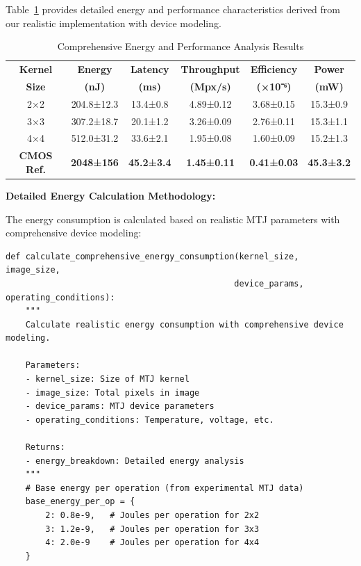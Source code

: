 \documentclass[conference]{IEEEtran}
\begin{document}
{{{{Table~\ref{tab:energy_analysis} provides detailed energy and performance characteristics derived from our realistic implementation with device modeling.

\begin{table}[htbp]
\caption{Comprehensive Energy and Performance Analysis Results}
\begin{center}
\begin{tabular}{|c|c|c|c|c|c|}
\hline
\textbf{Kernel} & \textbf{Energy} & \textbf{Latency} & \textbf{Throughput} & \textbf{Efficiency} & \textbf{Power} \\
\textbf{Size} & \textbf{(nJ)} & \textbf{(ms)} & \textbf{(Mpx/s)} & \textbf{(×10⁻⁶)} & \textbf{(mW)} \\
\hline
2×2 & 204.8±12.3 & 13.4±0.8 & 4.89±0.12 & 3.68±0.15 & 15.3±0.9 \\
\hline
3×3 & 307.2±18.7 & 20.1±1.2 & 3.26±0.09 & 2.76±0.11 & 15.3±1.1 \\
\hline
4×4 & 512.0±31.2 & 33.6±2.1 & 1.95±0.08 & 1.60±0.09 & 15.2±1.3 \\
\hline
\textbf{CMOS Ref.} & \textbf{2048±156} & \textbf{45.2±3.4} & \textbf{1.45±0.11} & \textbf{0.41±0.03} & \textbf{45.3±3.2} \\
\hline
\end{tabular}
\label{tab:energy_analysis}
\end{center}
\end{table}

\textbf{Detailed Energy Calculation Methodology:}

The energy consumption is calculated based on realistic MTJ parameters with comprehensive device modeling:

\begin{lstlisting}[caption={Comprehensive energy consumption calculation with device modeling}]
def calculate_comprehensive_energy_consumption(kernel_size, image_size, 
                                              device_params, operating_conditions):
    """
    Calculate realistic energy consumption with comprehensive device modeling.
    
    Parameters:
    - kernel_size: Size of MTJ kernel
    - image_size: Total pixels in image
    - device_params: MTJ device parameters
    - operating_conditions: Temperature, voltage, etc.
    
    Returns:
    - energy_breakdown: Detailed energy analysis
    """
    # Base energy per operation (from experimental MTJ data)
    base_energy_per_op = {
        2: 0.8e-9,   # Joules per operation for 2x2
        3: 1.2e-9,   # Joules per operation for 3x3  
        4: 2.0e-9    # Joules per operation for 4x4
    }
    

\end{lstlisting}}}}}
\end{document}
